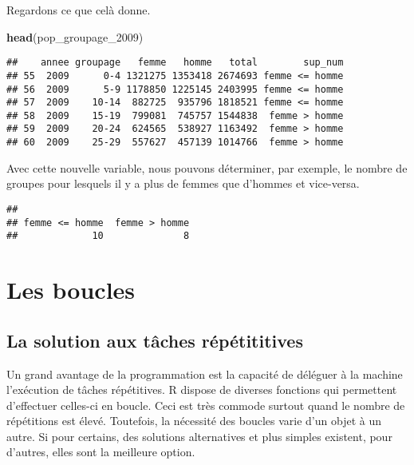 \documentclass[]{book}
\newenvironment{Shaded}{\begin{snugshade}}{\end{snugshade}}
\newcommand{\KeywordTok}[1]{\textcolor[rgb]{0.13,0.29,0.53}{\textbf{#1}}}
\newcommand{\DecValTok}[1]{\textcolor[rgb]{0.00,0.00,0.81}{#1}}
\newcommand{\OperatorTok}[1]{\textcolor[rgb]{0.81,0.36,0.00}{\textbf{#1}}}
\newcommand{\NormalTok}[1]{#1}
\begin{document}
Regardons ce que celà donne.

\begin{Shaded}
\begin{Highlighting}[]
\KeywordTok{head}\NormalTok{(pop_groupage_}\DecValTok{2009}\NormalTok{)}
\end{Highlighting}
\end{Shaded}

\begin{verbatim}
##    annee groupage   femme   homme   total        sup_num
## 55  2009      0-4 1321275 1353418 2674693 femme <= homme
## 56  2009      5-9 1178850 1225145 2403995 femme <= homme
## 57  2009    10-14  882725  935796 1818521 femme <= homme
## 58  2009    15-19  799081  745757 1544838  femme > homme
## 59  2009    20-24  624565  538927 1163492  femme > homme
## 60  2009    25-29  557627  457139 1014766  femme > homme
\end{verbatim}

Avec cette nouvelle variable, nous pouvons déterminer, par exemple, le
nombre de groupes pour lesquels il y a plus de femmes que d'hommes et
vice-versa.

\begin{Shaded}
\end{Shaded}

\begin{verbatim}
## 
## femme <= homme  femme > homme 
##             10              8
\end{verbatim}

\section{Les boucles}\label{les-boucles}

\subsection{La solution aux tâches
répétititives}\label{la-solution-aux-taches-repetititives}

Un grand avantage de la programmation est la capacité de déléguer à la
machine l'exécution de tâches répétitives. R dispose de diverses
fonctions qui permettent d'effectuer celles-ci en boucle. Ceci est très
commode surtout quand le nombre de répétitions est élevé. Toutefois, la
nécessité des boucles varie d'un objet à un autre. Si pour certains, des
solutions alternatives et plus simples existent, pour d'autres, elles
sont la meilleure option.
\end{document}
